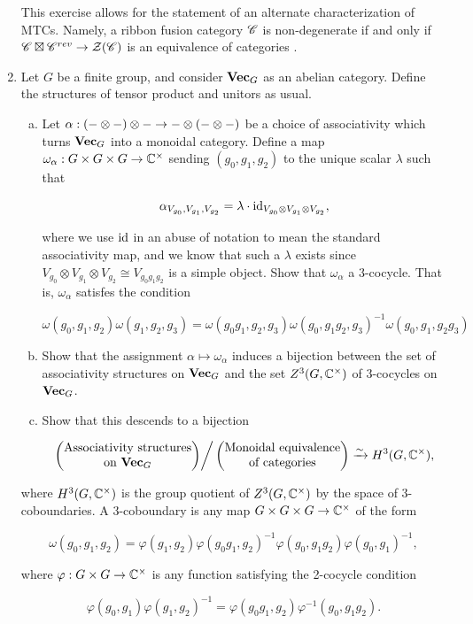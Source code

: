 \documentclass{article}
\theoremstyle{definition}
\numberwithin{figure}{section}
\begin{document}
\begin{enumerate}[\thesection .1.]
This exercise allows for the statement of an alternate characterization of MTCs. Namely, a ribbon fusion category $\mathscr{C}$ is non-degenerate if and only if $\mathscr{C}\boxtimes \mathscr{C}^{rev}\to \mathcal{Z}(\mathscr{C})$ is an equivalence of categories \cite[8.20.12]{etingof2016tensor}.

\item Let $G$ be a finite group, and consider $\bold{Vec}_G$ as an abelian category. Define the structures of tensor product and unitors as usual.

\begin{enumerate}[(a)]
\item Let $\alpha: (\-- \otimes \--)\otimes \--\to \--\otimes(\--\otimes\--)$ be a choice of associativity which turns $\bold{Vec}_G$ into a monoidal category. Define a map $\omega_\alpha: G\times G\times G\to \mathbb{C}^\times$ sending $(g_0,g_1,g_2)$ to the unique scalar $\lambda$ such that

$$\alpha_{V_{g_0},V_{g_1},V_{g_2}}=\lambda \cdot \mathrm{id}_{V_{g_0}\otimes V_{g_1}\otimes V_{g_2}},$$

where we use $\mathrm{id}$ in an abuse of notation to mean the standard associativity map, and we know that such a $\lambda$ exists since $V_{g_0}\otimes V_{g_1}\otimes V_{g_2}\cong V_{g_0g_1g_2}$ is a simple object. Show that $\omega_{\alpha}$ a $3$-cocycle. That is, $\omega_{\alpha}$ satisfes the condition

$$\omega(g_0,g_1,g_2)\omega(g_1,g_2,g_3)=\omega(g_0g_1,g_2,g_3)\omega(g_0,g_1g_2,g_3)^{-1}\omega(g_0,g_1,g_2g_3)$$

\item Show that the assignment $\alpha\mapsto \omega_{\alpha}$ induces a bijection between the set of associativity structures on $\bold{Vec}_G$ and the set $Z^3(G,\mathbb{C}^\times)$ of $3$-cocycles on $\bold{Vec}_G$.

\item Show that this descends to a bijection

$$
\left.\begin{pmatrix} \text{Associativity structures}\\
\text{on }\bold{Vec}_G
\end{pmatrix}\right/
\begin{pmatrix}
\text{Monoidal equivalence}\\
\text{of categories}
\end{pmatrix}\xrightarrow{\sim}H^3(G,\mathbb{C}^\times),$$
\end{enumerate}

where $H^3(G,\mathbb{C}^\times)$ is the group quotient of $Z^3(G,\mathbb{C}^\times)$ by the space of $3$-coboundaries. A $3$-coboundary is any map $G\times G\times G\to \mathbb{C}^\times$ of the form

$$\omega(g_0,g_1,g_2)=\varphi(g_1,g_2)\varphi(g_0g_1,g_2)^{-1}\varphi(g_0,g_1g_2)\varphi(g_0,g_1)^{-1},$$

where $\varphi:G\times G\to \mathbb{C}^\times$ is any function satisfying the 2-cocycle condition

$$\varphi(g_0,g_1)\varphi(g_1,g_2)^{-1}=\varphi(g_0g_1,g_2)\varphi^{-1}(g_0,g_1g_2).$$

\end{enumerate}
\end{document}
